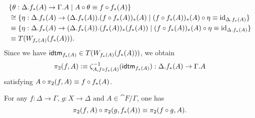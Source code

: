 \begin{constr}
\begin{align*}
& \{ \theta : \ctxext{\Delta}{f_\ast(A)}\to\ctxext{\Gamma}{A}\mid A\circ\theta\jdeq f\circ f_\ast(A) \} \\
  & \cong
\{ \eta : \ctxext{\Delta}{f_\ast(A)}\to\ctxext{{\Delta}{f_\ast(A)}}{(f\circ f_\ast(A))_\ast(A)}
  \mid (f\circ f_\ast(A))_\ast(A)\circ\eta\jdeq\catid{\ctxext{\Delta}{f_\ast(A)}}\} \\
  & \jdeq
\{ \eta : \ctxext{\Delta}{f_\ast(A)}\to\ctxext{{\Delta}{f_\ast(A)}}{(f_\ast(A))_\ast(f_\ast(A))}
  \mid (f\circ f_\ast(A))_\ast(A)\circ\eta\jdeq\catid{\ctxext{\Delta}{f_\ast(A)}}\} \\
  & \jdeq
T(W_{f_\ast(A)}(f_\ast(A))).
\end{align*}
Since we have $\tfid{f_\ast(A)}\in T(W_{f_\ast(A)}(f_\ast(A)))$, we obtain 
\begin{equation*}
\pi_2(f,A)\defeq \zeta_{A,f\circ f_\ast(A)}^{-1}(\tfid{f_\ast(A)}):\ctxext{\Delta}{f_\ast(A)}\to\ctxext{\Gamma}{A}
\end{equation*}
satisfying $A\circ\pi_2(f,A)\equiv f\circ f_\ast(A)$.
\end{constr}

\begin{lem}
For any $f:\Delta\to\Gamma$, $g:X\to\Delta$ and $A\in\cat{F}/\Gamma$, one has
\begin{equation*}
\pi_2(f,A)\circ\pi_2(g,f_\ast(A))\equiv\pi_2(f\circ g,A).
\end{equation*}
\end{lem}


